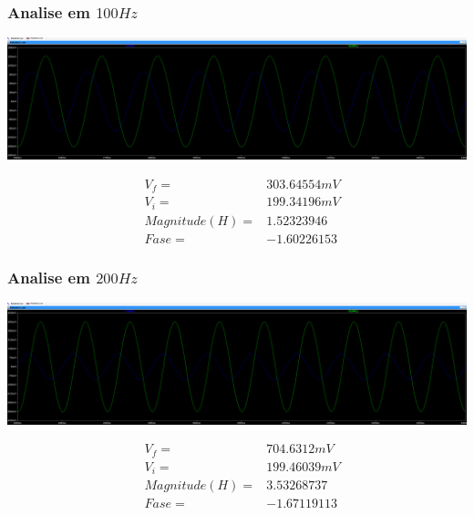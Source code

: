 \documentclass[12pt,twoside, a4paper, twocolumn]{article}
\begin{document}
\subsubsection{Analise em $100Hz$}


\begin{adjustbox}{scale=0.09}
    \includegraphics{ltfreq100.png}
\end{adjustbox}


\begin{equation*}
    \begin{aligned}
         & V_f =          & 303.64554mV \\
         & V_i =          & 199.34196mV \\
         & Magnitude(H) = & 1.52323946  \\
         & Fase =         & -1.60226153
    \end{aligned}
\end{equation*}




\subsubsection{Analise em $200Hz$}


\begin{adjustbox}{scale=0.09}
    \includegraphics{ltfreq200.png}
\end{adjustbox}


\begin{equation*}
    \begin{aligned}
         & V_f =          & 704.6312mV  \\
         & V_i =          & 199.46039mV \\
         & Magnitude(H) = & 3.53268737  \\
         & Fase =         & -1.67119113
    \end{aligned}
\end{equation*}
\end{document}
